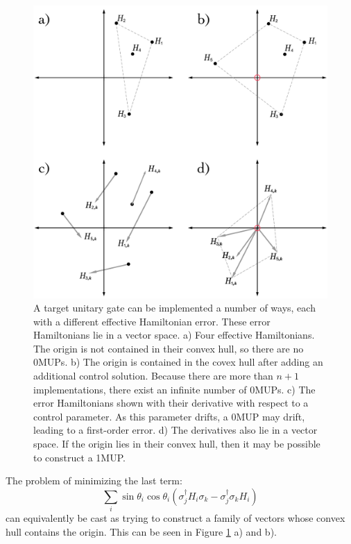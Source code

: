 \documentclass[aps,nofootinbib,pra,notitlepage,twocolumn]{revtex4-1}
\begin{document}
\begin{figure}
  \centering
  \includegraphics[width=\columnwidth]{vectorspace.pdf}
  \caption{A target unitary gate can be implemented a number of ways, each with a different effective Hamiltonian error. These error Hamiltonians lie in a vector space. a) Four effective Hamiltonians. The origin is not contained in their convex hull, so there are no 0MUPs. b) The origin is contained in the covex hull after adding an additional control solution. Because there are more than $n+1$ implementations, there exist an infinite number of 0MUPs. c) The error Hamiltonians shown with their derivative with respect to a control parameter. As this parameter drifts, a 0MUP may drift, leading to a first-order error. d) The derivatives also lie in a vector space. If the origin lies in their convex hull, then it may be possible to construct a 1MUP.}
  \label{fig:vectorspace}
\end{figure}

The problem of minimizing the last term:
\begin{equation}
\sum_i\sin\theta_i\cos\theta_i(\sigma_j^{\dagger}H_i\sigma_k - \sigma_j^{\dagger}\sigma_kH_i)
\end{equation}
 can equivalently be cast as trying to construct a family of vectors whose convex hull contains the origin. This can be seen in Figure \ref{fig:vectorspace} a) and b).
\end{document}
